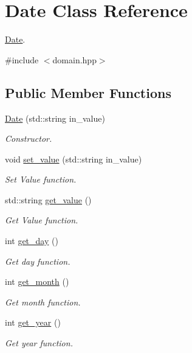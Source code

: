 \hypertarget{classDate}{}\section{Date Class Reference}
\label{classDate}


\hyperlink{classDate}{Date}.  




{\ttfamily \#include $<$domain.\+hpp$>$}

\subsection*{Public Member Functions}
\begin{DoxyCompactItemize}
\item 
\hyperlink{classDate_a7ab38b0ebb2b512b546cfeb5a984a214}{Date} (std\+::string in\+\_\+value)
\begin{DoxyCompactList}\small\item\em Constructor. \end{DoxyCompactList}\item 
void \hyperlink{classDate_af493bc102f9e980e53a78e884e25cbd2}{set\+\_\+value} (std\+::string in\+\_\+value)
\begin{DoxyCompactList}\small\item\em Set Value function. \end{DoxyCompactList}\item 
std\+::string \hyperlink{classDate_a93e020f3682ac17db47fc5e6edfea5af}{get\+\_\+value} ()
\begin{DoxyCompactList}\small\item\em Get Value function. \end{DoxyCompactList}\item 
int \hyperlink{classDate_a98037ef869b600d1df44ba6854771cf5}{get\+\_\+day} ()
\begin{DoxyCompactList}\small\item\em Get day function. \end{DoxyCompactList}\item 
int \hyperlink{classDate_a3c9167735b349cdc2e60155d2d79f14b}{get\+\_\+month} ()
\begin{DoxyCompactList}\small\item\em Get month function. \end{DoxyCompactList}\item 
int \hyperlink{classDate_ac11d382ea1458599532db3340271a7e7}{get\+\_\+year} ()
\begin{DoxyCompactList}\small\item\em Get year function. \end{DoxyCompactList}\end{DoxyCompactItemize}
